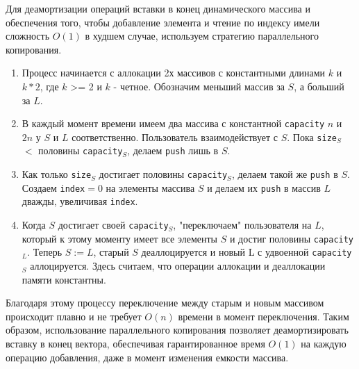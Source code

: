 \documentclass[11pt]{article}
\begin{document}
\begin{solution}
	Для деамортизации операций вставки в конец динамического массива и обеспечения того, чтобы добавление элемента и чтение по индексу имели сложность $O(1)$ в худшем случае, используем стратегию параллельного копирования.

	\begin{enumerate}
		\item Процесс начинается с аллокации 2х массивов с константными длинами $ k $ и $ k * 2 $, где $ k $ >= 2 и $ k $ - четное. Обозначим меньший массив за $S$, а больший за $L$.
		
		\item В каждый момент времени имеем два массива с константной \texttt{capacity} $ n $ и $ 2n $ у $S$ и $L$ соответственно. Пользователь взаимодействует с $S$. Пока \texttt{size}$_S$ $<$ половины \texttt{capacity}$_S$, делаем \texttt{push} лишь в $S$.

		\item Как только \texttt{size}$_S$ достигает половины \texttt{capacity}$_S$, делаем такой же \texttt{push} в $S$. Создаем \texttt{index}$=0$ на элементы массива $S$ и делаем их \texttt{push} в массив $L$ дважды, увеличивая \texttt{index}.
	
		\item Когда $S$ достигает своей \texttt{capacity}$_S$, "переключаем" пользователя на $L$, который к этому моменту имеет все элементы $S$ и достиг половины \texttt{capacity}$_L$. Теперь $S:=L$, старый $S$ деаллоцируется и новый L с удвоенной \texttt{capacity}$_S$ аллоцируется. Здесь считаем, что операции аллокации и деаллокации памяти константны.
	\end{enumerate}

	Благодаря этому процессу переключение между старым и новым массивом происходит плавно и не требует $O(n)$ времени в момент переключения.
	Таким образом, использование параллельного копирования позволяет деамортизировать вставку в конец вектора, обеспечивая гарантированное время $O(1)$ на каждую операцию добавления, даже в момент изменения емкости массива.
\end{solution}
\end{document}
